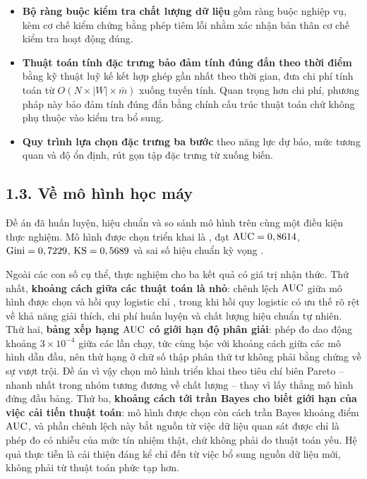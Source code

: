 \begin{itemize}
  \item \textbf{Bộ ràng buộc kiểm tra chất lượng dữ liệu} gồm \NConstraints{}
  ràng buộc nghiệp vụ, kèm cơ chế kiểm chứng bằng phép tiêm lỗi nhằm xác nhận
  bản thân cơ chế kiểm tra hoạt động đúng.

  \item \textbf{Thuật toán tính đặc trưng bảo đảm tính đúng đắn theo thời điểm}
  bằng kỹ thuật luỹ kế kết hợp ghép gần nhất theo thời gian, đưa chi phí tính
  toán từ $O(N \times |W| \times \bar{m})$ xuống tuyến tính. Quan trọng hơn chi
  phí, phương pháp này bảo đảm tính đúng đắn bằng chính cấu trúc thuật toán chứ
  không phụ thuộc vào kiểm tra bổ sung.

  \item \textbf{Quy trình lựa chọn đặc trưng ba bước} theo năng lực dự báo, mức
  tương quan và độ ổn định, rút gọn tập đặc trưng từ \NFeaturesInitial{} xuống
  \NFeaturesSelected{} biến.
\end{itemize}

\subsection*{1.3. Về mô hình học máy}

Đề án đã huấn luyện, hiệu chuẩn và so sánh \NModels{} mô hình trên cùng một điều
kiện thực nghiệm. Mô hình được chọn triển khai là \BestModel{}, đạt
$\mathrm{AUC} = 0,8614{}$, $\text{Gini} = 0,7229{}$, $\mathrm{KS} = 0,5689{}$ và sai số
hiệu chuẩn kỳ vọng \BestECE{}.

Ngoài các con số cụ thể, thực nghiệm cho ba kết quả có giá trị nhận thức. Thứ
nhất, \textbf{khoảng cách giữa các thuật toán là nhỏ}: chênh lệch $\mathrm{AUC}$ giữa mô
hình được chọn và hồi quy logistic chỉ \GapBestLR{}, trong khi hồi quy logistic
có ưu thế rõ rệt về khả năng giải thích, chi phí huấn luyện và chất lượng hiệu
chuẩn tự nhiên. Thứ hai, \textbf{bảng xếp hạng $\mathrm{AUC}$ có giới hạn độ phân giải}:
phép đo dao động khoảng $3 \times 10^{-4}$ giữa các lần chạy, tức cùng bậc với
khoảng cách giữa các mô hình dẫn đầu, nên thứ hạng ở chữ số thập phân thứ tư
không phải bằng chứng về sự vượt trội. Đề án vì vậy chọn mô hình triển khai theo
tiêu chí biên Pareto -- nhanh nhất trong nhóm tương đương về chất lượng -- thay
vì lấy thẳng mô hình đứng đầu bảng. Thứ ba, \textbf{khoảng cách tới trần Bayes
cho biết giới hạn của việc cải tiến thuật toán}: mô hình được chọn còn cách trần
Bayes \BayesAUC{} khoảng
\GapBayes{} điểm $\mathrm{AUC}$, và phần chênh lệch này bắt nguồn từ việc dữ liệu quan sát được
chỉ là phép đo có nhiễu của mức tín nhiệm thật, chứ không phải do thuật toán yếu.
Hệ quả thực tiễn là cải thiện đáng kể chỉ đến từ việc bổ sung nguồn dữ liệu mới,
không phải từ thuật toán phức tạp hơn.

